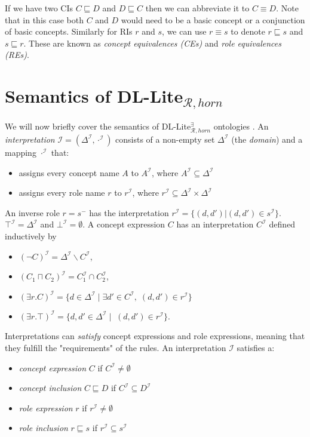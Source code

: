 If we have two CIs $C\sqsubseteq D$ and $D \sqsubseteq C$ then we can abbreviate it to $C \equiv D$. Note that in this case both $C$ and $D$ would need to be a basic concept or a conjunction of basic concepts. Similarly for RIs $r$ and $s$, we can use $r\equiv s$ to denote $r\sqsubseteq s$ and $s \sqsubseteq r$. These are known as \emph{concept equivalences (CEs)} and \emph{role equivalences (REs)}.

\section{Semantics of DL-Lite$_{\mathcal{R}, horn}$}
We will now briefly cover the semantics of DL-Lite$_{\mathcal{R}, horn}^{\exists}$ ontologies \cite{baader_horrocks_lutz_sattler_2017}. An \emph{interpretation} $\mathcal{I} = (\Delta^{\mathcal{I}}, \cdot^{\mathcal{I}})$ consists of a non-empty set $\Delta^{\mathcal{I}}$ (the \emph{domain}) and a mapping $\cdot^{\mathcal{I}}$ that:
\begin{itemize}
    \item assigns every concept name $A$ to $A^{\mathcal{I}}$, where $A^{\mathcal{I}}\subseteq \Delta^{\mathcal{I}}$
    \item assigns every role name $r$ to  $r^{\mathcal{I}}$, where $r^{\mathcal{I}}\subseteq \Delta^{\mathcal{I}}\times \Delta^{\mathcal{I}}$
\end{itemize}
An inverse role $r = s^-$ has the interpretation $r^{\mathcal{I}}=\{(d, d') | (d,d')\in s^{\mathcal{I}}\}$. $ \top^{\mathcal{I}} = \Delta^{\mathcal{I}} $ and $ \bot^{\mathcal{I}} = \emptyset $. A concept expression $C$ has an interpretation $C^{\mathcal{I}}$ defined inductively by
\begin{itemize}
    \item $(\neg C)^{\mathcal{I}} = \Delta^{\mathcal{I}} \backslash C^{\mathcal{I}} $,
    \item $ (C_{1} \sqcap C_{2})^{\mathcal{I}} = C_{1}^{\mathcal{I}} \cap C_{2}^{\mathcal{I}} $,
    \item $ (\exists r.C)^{\mathcal{I}} = \{d\in \Delta ^{\mathcal{I}}\;|\; \exists d' \in C^{\mathcal{I}}, \; (d,d')\in r^{\mathcal{I}}\} $
    \item $ (\exists r.\top)^{\mathcal{I}} = \{d, d'\in \Delta ^{\mathcal{I}}\;|\; \; (d,d')\in r^{\mathcal{I}}\} $.
\end{itemize}

Interpretations can \emph{satisfy} concept expressions and role expressions, meaning that they fulfill the "requirements" of the rules. An interpretation $\mathcal{I}$ satisfies a:
\begin{itemize}
    \item \emph{concept expression} $C$ if $C^{\mathcal{I}} \neq \emptyset$
    \item \emph{concept inclusion} $C \sqsubseteq D$ if $C^{\mathcal{I}} \subseteq D^{\mathcal{I}}$
    \item \emph{role expression} $r$ if $r^{\mathcal{I}} \neq \emptyset$
    \item \emph{role inclusion } $r \sqsubseteq s$ if $r^{\mathcal{I}}  \subseteq s^{\mathcal{I}}$
\end{itemize} 

